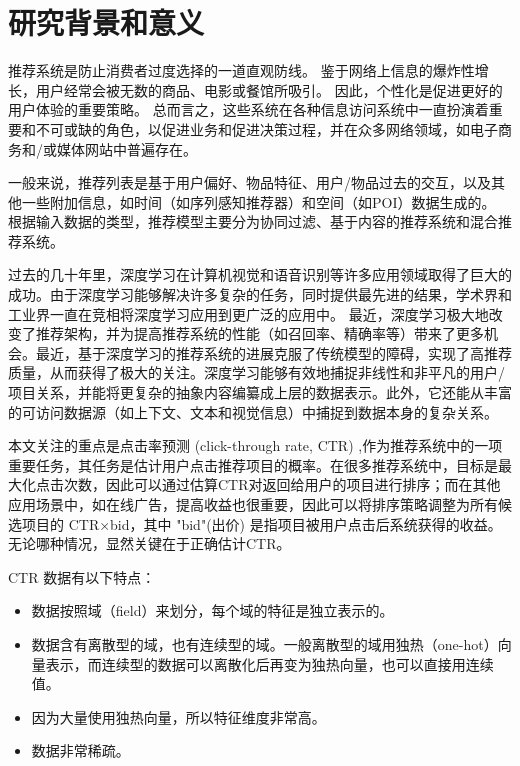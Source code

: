 \documentclass[degree=master,cjk-font=noto]{thuthesis}
\begin{document}
\tableofcontents

\listoffiguresandtables

\mainmatter

\chapter{研究背景和意义}

推荐系统是防止消费者过度选择的一道直观防线。
鉴于网络上信息的爆炸性增长，用户经常会被无数的商品、电影或餐馆所吸引。
因此，个性化是促进更好的用户体验的重要策略。
总而言之，这些系统在各种信息访问系统中一直扮演着重要和不可或缺的角色，以促进业务和促进决策过程，并在众多网络领域，如电子商务和/或媒体网站中普遍存在。

一般来说，推荐列表是基于用户偏好、物品特征、用户/物品过去的交互，以及其他一些附加信息，如时间（如序列感知推荐器）和空间（如POI）数据生成的。
根据输入数据的类型，推荐模型主要分为协同过滤、基于内容的推荐系统和混合推荐系统。

过去的几十年里，深度学习在计算机视觉和语音识别等许多应用领域取得了巨大的成功。由于深度学习能够解决许多复杂的任务，同时提供最先进的结果，学术界和工业界一直在竞相将深度学习应用到更广泛的应用中。
最近，深度学习极大地改变了推荐架构，并为提高推荐系统的性能（如召回率、精确率等）带来了更多机会。最近，基于深度学习的推荐系统的进展克服了传统模型的障碍，实现了高推荐质量，从而获得了极大的关注。深度学习能够有效地捕捉非线性和非平凡的用户/项目关系，并能将更复杂的抽象内容编纂成上层的数据表示。此外，它还能从丰富的可访问数据源（如上下文、文本和视觉信息）中捕捉到数据本身的复杂关系。

本文关注的重点是点击率预测 (click-through rate, CTR) ,作为推荐系统中的一项重要任务，其任务是估计用户点击推荐项目的概率。在很多推荐系统中，目标是最大化点击次数，因此可以通过估算CTR对返回给用户的项目进行排序；而在其他应用场景中，如在线广告，提高收益也很重要，因此可以将排序策略调整为所有候选项目的 CTR×bid，其中 "bid"(出价) 是指项目被用户点击后系统获得的收益。无论哪种情况，显然关键在于正确估计CTR。

CTR 数据有以下特点：

\begin{itemize}
  \item 数据按照域（field）来划分，每个域的特征是独立表示的。
  \item 数据含有离散型的域，也有连续型的域。一般离散型的域用独热（one-hot）向量表示，而连续型的数据可以离散化后再变为独热向量，也可以直接用连续值。
  \item 因为大量使用独热向量，所以特征维度非常高。
  \item 数据非常稀疏。
\end{itemize}
\end{document}
